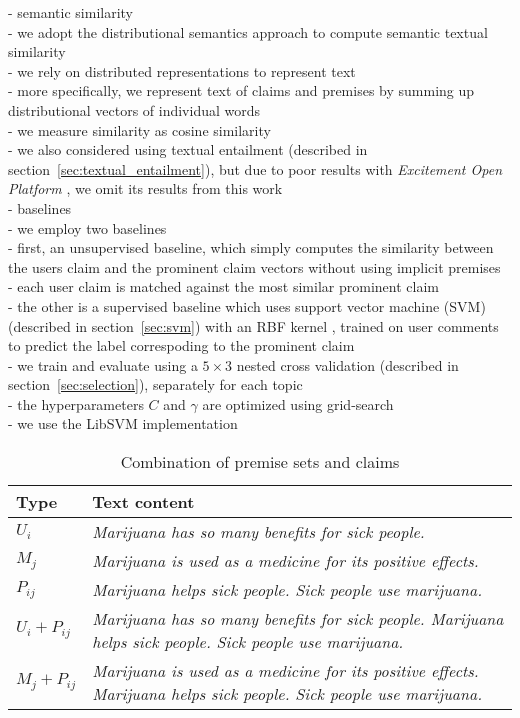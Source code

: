 \noindent - semantic similarity  \\
- we adopt the distributional semantics approach to compute semantic textual similarity \\
- we rely on distributed representations \citep{sec:word_representations} to represent text \\
- more specifically, we represent text of claims and premises by summing up distributional
vectors of individual words \\
- we measure similarity as cosine similarity \\
- we also considered using textual entailment (described in section~\ref{sec:textual_entailment}),
but due to poor results with \textit{Excitement Open Platform}
\citep{pado2015design}, we omit its results from this work \\

\noindent - baselines \\
- we employ two baselines \\
- first, an unsupervised baseline, which simply computes the similarity between the users claim and
the prominent claim vectors without using implicit premises \\
- each user claim is matched against the most similar prominent claim \\
- the other is a supervised baseline which uses support vector machine (SVM) (described in section~\ref{sec:svm})
with an RBF kernel , trained on user comments to predict the label correspoding to the 
prominent claim \\
- we train and evaluate using a $5 \times 3$ nested cross validation (described in
section~\ref{sec:selection}), separately for each topic \\
- the hyperparameters $C$ and $\gamma$ are optimized using grid-search \\
- we use the LibSVM implementation \citep{chang2011libsvm} \\

\begin{table}
\begin{center}
{\small
{\def\arraystretch{1.2}\tabcolsep=2pt
\begin{tabular}{@{}lp{13cm}@{}}
\toprule
Type & Text content  \\
\midrule
$U_i$      & \emph{Marijuana has so many benefits for sick people.} \\
$M_j$    & \emph{Marijuana is used as a medicine for its positive effects.}   \\
$P_{ij}$     & \emph{Marijuana helps sick people. Sick people use marijuana.} \\
\midrule
$U_i + P_{ij}$   & \emph{Marijuana has so many benefits for sick people.
Marijuana helps sick people. Sick people use marijuana.} \\ 
$M_j + P_{ij}$   & \emph{Marijuana is used as a medicine for its positive
effects. Marijuana helps sick people. Sick people use marijuana.}\\
\bottomrule
\end{tabular}}}
\caption{Combination of premise sets and claims}
\label{tab:argpremise_concatenation}
\end{center}
\end{table}


